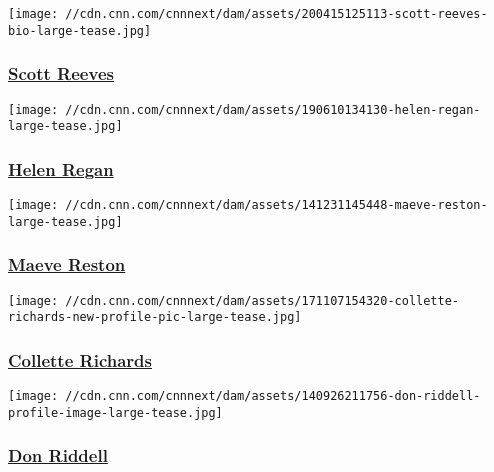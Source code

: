 \href{/profiles/scott-reeves}{}

\texttt{[image: //cdn.cnn.com/cnnnext/dam/assets/200415125113-scott-reeves-bio-large-tease.jpg]}

\hypertarget{scott-reeves}{%
\subsubsection{\texorpdfstring{\href{/profiles/scott-reeves}{Scott
Reeves}}{Scott Reeves}}\label{scott-reeves}}

\href{/profiles/helen-regan}{}

\texttt{[image: //cdn.cnn.com/cnnnext/dam/assets/190610134130-helen-regan-large-tease.jpg]}

\hypertarget{helen-regan}{%
\subsubsection{\texorpdfstring{\href{/profiles/helen-regan}{Helen
Regan}}{Helen Regan}}\label{helen-regan}}

\href{/profiles/maeve-reston}{}

\texttt{[image: //cdn.cnn.com/cnnnext/dam/assets/141231145448-maeve-reston-large-tease.jpg]}

\hypertarget{maeve-reston}{%
\subsubsection{\texorpdfstring{\href{/profiles/maeve-reston}{Maeve
Reston}}{Maeve Reston}}\label{maeve-reston}}

\href{/profiles/collette-richards}{}

\texttt{[image: //cdn.cnn.com/cnnnext/dam/assets/171107154320-collette-richards-new-profile-pic-large-tease.jpg]}

\hypertarget{collette-richards}{%
\subsubsection{\texorpdfstring{\href{/profiles/collette-richards}{Collette
Richards}}{Collette Richards}}\label{collette-richards}}

\href{/profiles/don-riddell}{}

\texttt{[image: //cdn.cnn.com/cnnnext/dam/assets/140926211756-don-riddell-profile-image-large-tease.jpg]}

\hypertarget{don-riddell}{%
\subsubsection{\texorpdfstring{\href{/profiles/don-riddell}{Don
Riddell}}{Don Riddell}}\label{don-riddell}}

